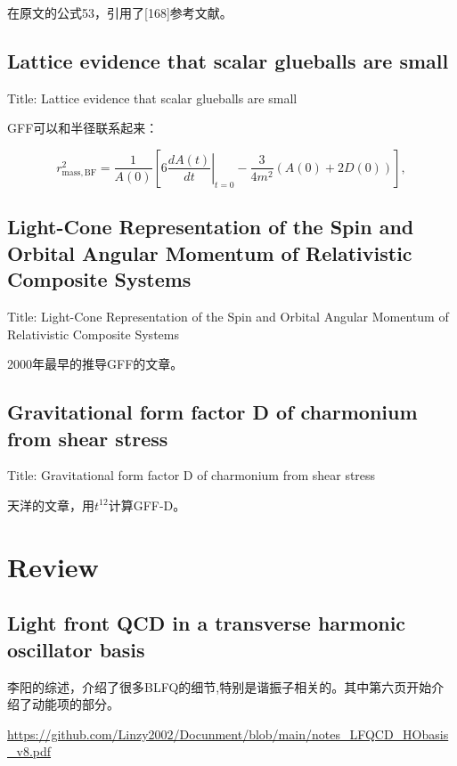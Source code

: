 \documentclass{article}
\begin{document}
在原文的公式53，引用了[168]参考文献。


\subsection{Lattice evidence that scalar glueballs are small}

Title: \quad  Lattice evidence that scalar glueballs are small \cite{abbott2025latticeevidencescalarglueballs}

GFF可以和半径联系起来：

\begin{equation}
    r_{\mathrm{mass}, \mathrm{BF}}^2=\frac{1}{A(0)}\left[\left.6 \frac{d A(t)}{d t}\right|_{t=0}-\frac{3}{4 m^2}(A(0)+2 D(0))\right],
\end{equation}


\subsection{Light-Cone Representation of the Spin and Orbital Angular Momentum of Relativistic Composite Systems}

Title: \quad Light-Cone Representation of the Spin and Orbital Angular Momentum of Relativistic Composite Systems \cite{Brodsky_2001}

2000年最早的推导GFF的文章。


\subsection{Gravitational form factor D of charmonium from shear stress}

Title: Gravitational form factor D of charmonium from shear stress \cite{PhysRevD.111.074031}

天洋的文章，用$t^{12}$计算GFF-D。

\section{Review}

\subsection{Light front QCD in a transverse harmonic oscillator basis}

李阳的综述，介绍了很多BLFQ的细节,特别是谐振子相关的。其中第六页开始介绍了动能项的部分。

\url{https://github.com/Linzy2002/Docunment/blob/main/notes_LFQCD_HObasis_v8.pdf}
\end{document}
